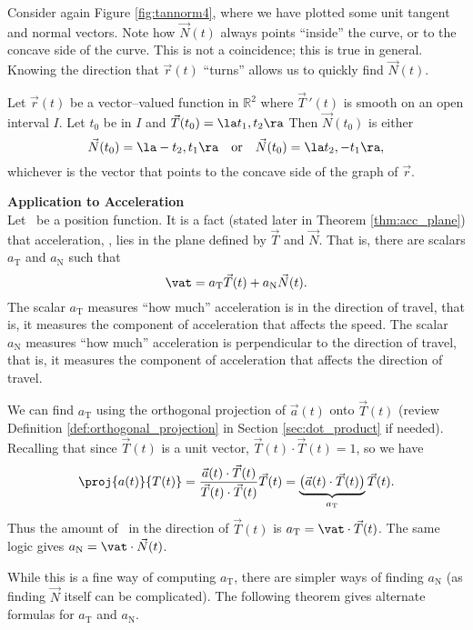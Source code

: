 Consider again Figure \ref{fig:tannorm4}, where we have plotted some unit tangent and normal vectors. Note how $\vec N(t)$ always points ``inside'' the curve, or to the concave side of the curve. This is not a coincidence; this is true in general. Knowing the direction that $\vec r(t)$ ``turns'' allows us to quickly find $\vec N(t)$.


{Let $\vec r(t)$ be a vector--valued function in $\mathbb{R}^2$ where $\vec T\,'(t)$ is smooth on an open interval $I$. Let $t_0$ be in $I$ and $\vec T(t_0) = \la t_1,t_2\ra$ Then $\vec N(t_0)$ is either
$$\vec N(t_0) = \la -t_2,t_1\ra \quad \text{or}\quad \vec N(t_0) = \la t_2,-t_1\ra,$$ whichever is the vector that points to the concave side of the graph of $\vec r$.
}

\noindent\textbf{\large Application to Acceleration}\\

Let \vrt\ be a position function. It is a fact (stated later in Theorem \ref{thm:acc_plane}) %
 that acceleration, \vat, lies in the plane defined by $\vec T$ and $\vec N$. That is, there are scalars $a_{\text{T}}$ and $a_{\text{N}}$ such that 
$$\vat = a_{\text{T}}\vec T(t) + a_{\text{N}}\vec N(t).$$
The scalar $a_{\text{T}}$ measures ``how much'' acceleration is in the direction of travel, that is, it measures the component of acceleration that affects the speed. The scalar $a_{\text{N}}$ measures ``how much'' acceleration is perpendicular to the direction of travel, that is, it measures the component of acceleration that affects the direction of travel.

We can find $a_{\text{T}}$ using the orthogonal projection of $\vec a(t)$ onto $\vec T(t)$ (review Definition \ref{def:orthogonal_projection} in Section \ref{sec:dot_product} if needed).
Recalling that since $\vec T(t)$ is a unit vector, $\vec T(t)\cdot\vec T(t)=1$, so we have 
$$\proj{a(t)}{T(t)} = \frac{\vec a(t)\cdot\vec T(t)}{\vec T(t)\cdot\vec T(t)}\vec T(t) = \underbrace{\big(\vec a(t)\cdot\vec T(t)\big)}_{a_{\text{T}}}\vec T(t).$$
Thus the amount of \vat\ in the direction of $\vec T(t)$ is $a_{\text{T}}=\vat\cdot\vec T(t)$. The same logic gives $a_{\text{N}} = \vat\cdot\vec N(t)$.

While this is a fine way of computing $a_{\text{T}}$, there are simpler ways of finding $a_{\text{N}}$ (as finding $\vec N$ itself can be complicated). The following theorem gives alternate formulas for $a_{\text{T}}$ and $a_{\text{N}}$.

